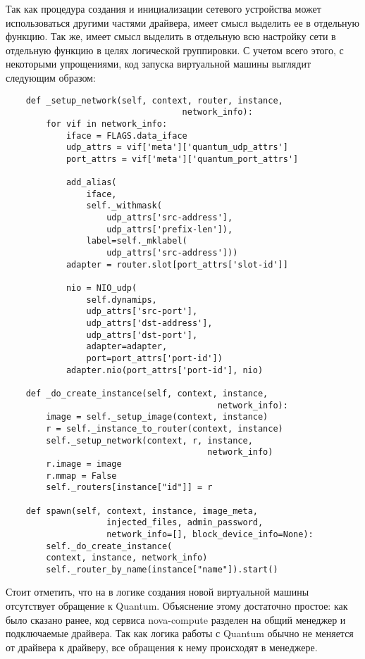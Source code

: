 Так как процедура создания и инициализации сетевого устройства может использоваться другими
частями драйвера, имеет смысл выделить ее в отдельную функцию. Так же, имеет смысл выделить
в отдельную всю настройку сети в отдельную функцию в целях логической группировки.
С учетом всего этого, с некоторыми упрощениями, 
код запуска виртуальной машины выглядит следующим образом:
\begin{lstlisting}
    def _setup_network(self, context, router, instance, 
                                   network_info):
        for vif in network_info:
            iface = FLAGS.data_iface
            udp_attrs = vif['meta']['quantum_udp_attrs']
            port_attrs = vif['meta']['quantum_port_attrs']

            add_alias(
                iface,
                self._withmask(
                    udp_attrs['src-address'], 
                    udp_attrs['prefix-len']),
                label=self._mklabel(
                    udp_attrs['src-address']))
            adapter = router.slot[port_attrs['slot-id']]

            nio = NIO_udp(
                self.dynamips,
                udp_attrs['src-port'],
                udp_attrs['dst-address'],
                udp_attrs['dst-port'],
                adapter=adapter,
                port=port_attrs['port-id'])
            adapter.nio(port_attrs['port-id'], nio)
                    
    def _do_create_instance(self, context, instance, 
                                          network_info):
        image = self._setup_image(context, instance)
        r = self._instance_to_router(context, instance)
        self._setup_network(context, r, instance, 
                                        network_info)
        r.image = image
        r.mmap = False
        self._routers[instance["id"]] = r

    def spawn(self, context, instance, image_meta, 
                    injected_files, admin_password, 
                    network_info=[], block_device_info=None):
        self._do_create_instance(
        context, instance, network_info)
        self._router_by_name(instance["name"]).start()
\end{lstlisting}

Стоит отметить, что на в логике создания новой виртуальной машины отсутствует 
обращение к Quantum. Объяснение этому достаточно простое: как было сказано ранее,
код сервиса nova-compute разделен на общий менеджер и подключаемые драйвера.
Так как логика работы с Quantum обычно не меняется от драйвера к драйверу, все обращения
к нему происходят в менеджере.

